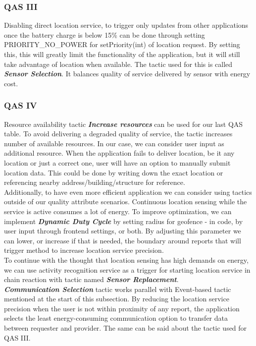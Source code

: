 \subsubsection{QAS III}
Disabling direct location service, to trigger only updates from other applications once the battery charge is below 15\% can be done through setting PRIORITY\_NO\_POWER for setPriority(int) of location request. By setting this, this will greatly limit the functionality of the application, but it will still take advantage of location when available. The tactic used for this is called \textbf{\textit{Sensor Selection}}. It balances quality of service delivered by sensor with energy cost.

\subsubsection{QAS IV}
Resource availability tactic \textbf{\textit{Increase resources}} can be used for our last QAS table. To avoid delivering a degraded quality of service, the tactic increases number of available resources. In our case, we can consider user input as additional resource. When the application fails to deliver location, be it any location or just a correct one, user will have an option to manually submit location data. This could be done by writing down the exact location or referencing nearby address/building/structure for reference.
~\\

Additionally, to have even more efficient application we can consider using tactics outside of our quality attribute scenarios. Continuous location sensing while the service is active consumes a lot of energy. To improve optimization, we can implement \textbf{\textit{Dynamic Duty Cycle}} by setting radius for geofence - in code, by user input through frontend settings, or both. By adjusting this parameter we can lower, or increase if that is needed, the boundary around reports that will trigger method to increase location service precision.
~\\

To continue with the thought that location sensing has high demands on energy, we can use activity recognition service as a trigger for starting location service in chain reaction with tactic named \textbf{\textit{Sensor Replacement}}.
~\\

\textbf{\textit{Communication Selection}} tactic works parallel with Event-based tactic mentioned at the start of this subsection. By reducing the location service precision when the user is not within proximity of any report, the application selects the least energy-consuming communication option to transfer data between requester and provider. The same can be said about the tactic used for QAS III.
~\\

